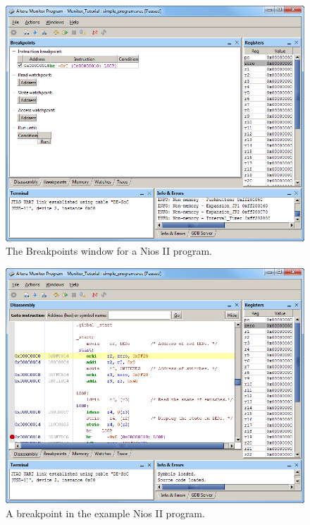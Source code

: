 \documentclass[11pt, twoside, pdftex]{article}
\begin{document}
\begin{figure}[H]
   \begin{center}
      \includegraphics[scale=0.6]{screenshots/figure27.png}
   \end{center}
   \caption{The Breakpoints window for a Nios II program.} 
   \label{fig:AMP_breakpoints_nios}
\end{figure}

\begin{figure}[H]
   \begin{center}
      \includegraphics[scale=0.6]{screenshots/figure28.png}
   \end{center}
   \caption{A breakpoint in the example Nios II program.} 
   \label{fig:AMP_breakpointexample_nios}
\end{figure}
\end{document}
